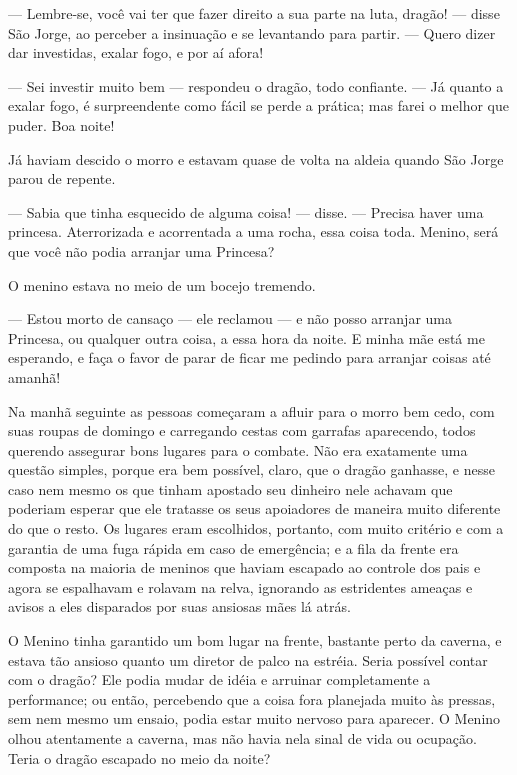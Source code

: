 — Lembre-se, você vai ter que fazer direito a sua parte na luta,
dragão! — disse São Jorge, ao perceber a insinuação e se levantando
para partir. — Quero dizer dar investidas, exalar fogo, e por aí
afora!

— Sei investir muito bem — respondeu o dragão, todo confiante. — Já
quanto a exalar fogo, é surpreendente como fácil se perde a prática;
mas farei o melhor que puder. Boa noite!

Já haviam descido o morro e estavam quase de volta na aldeia quando
São Jorge parou de repente.

— Sabia que tinha esquecido de alguma coisa! — disse. — Precisa haver
uma princesa. Aterrorizada e acorrentada a uma rocha, essa coisa
toda. Menino, será que você não podia arranjar uma Princesa?

O menino estava no meio de um bocejo tremendo.

— Estou morto de cansaço — ele reclamou — e não posso arranjar uma
Princesa, ou qualquer outra coisa, a essa hora da noite. E minha mãe
está me esperando, e faça o favor de parar de ficar me pedindo para
arranjar coisas até amanhã!

Na manhã seguinte as pessoas começaram a afluir para o morro bem cedo,
com suas roupas de domingo e carregando cestas com garrafas
aparecendo, todos querendo assegurar bons lugares para o combate. Não
era exatamente uma questão simples, porque era bem possível, claro,
que o dragão ganhasse, e nesse caso nem mesmo os que tinham apostado
seu dinheiro nele achavam que poderiam esperar que ele tratasse os
seus apoiadores de maneira muito diferente do que o resto. Os lugares
eram escolhidos, portanto, com muito critério e com a garantia de uma
fuga rápida em caso de emergência; e a fila da frente era composta na
maioria de meninos que haviam escapado ao controle dos pais e agora
se espalhavam e rolavam na relva, ignorando as estridentes ameaças e
avisos a eles disparados por suas ansiosas mães lá atrás.

O Menino tinha garantido um bom lugar na frente, bastante perto da
caverna, e estava tão ansioso quanto um diretor de palco na estréia.
Seria possível contar com o dragão? Ele podia mudar de idéia e
arruinar completamente a performance; ou então, percebendo que a
coisa fora planejada muito às pressas, sem nem mesmo um ensaio, podia
estar muito nervoso para aparecer. O Menino olhou atentamente a
caverna, mas não havia nela sinal de vida ou ocupação. Teria o dragão
escapado no meio da noite?

